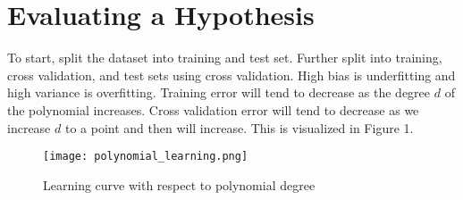 \documentclass[12pt]{article}
\begin{document}
\section{Evaluating a Hypothesis}
To start, split the dataset into training and test set. Further split into training, cross validation, and test sets using cross validation. High bias is underfitting and high variance is overfitting. Training error will tend to decrease as the degree $d$ of the polynomial increases. Cross validation error will tend to decrease as we increase $d$ to a point and then will increase. This is visualized in Figure 1.\\ 

\begin{figure}
\centering
\texttt{[image: polynomial\_learning.png]}
\caption{Learning curve with respect to polynomial degree}
\label{fig:polynomiallearning}
\end{figure}
\end{document}
